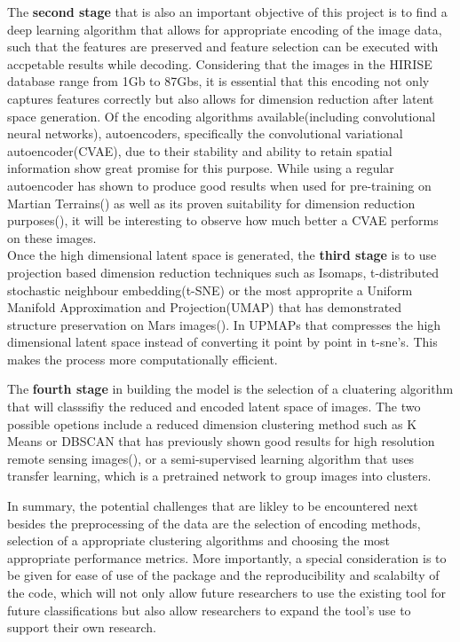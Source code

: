 \documentclass[project-plan]{report-template}
\begin{document}
The \textbf{second stage} that is also an important objective of this project is to find a deep learning algorithm that allows for appropriate encoding of the image data, such that the features are preserved and feature selection can be executed with accpetable results while decoding. Considering that the images in the HIRISE database range from 1Gb to 87Gbs, it is essential that this encoding not only captures features correctly but also allows for dimension reduction after latent space generation. Of the encoding algorithms available(including convolutional neural networks), autoencoders, specifically the convolutional variational autoencoder(CVAE), due to their stability and ability to retain spatial information show great promise for this purpose. While using a regular autoencoder has shown to produce good results when used for pre-training on Martian Terrains(\citeauthor{Rothrock2016SPOCDL}) as well as its proven suitability for dimension reduction purposes(\citeauthor{WANG2016232}), it will be interesting to observe how much better a CVAE performs on these images. \\

Once the high dimensional latent space is generated, the \textbf{third stage} is to use projection based dimension reduction techniques such as Isomaps, t-distributed stochastic neighbour embedding(t-SNE) or the most approprite a Uniform Manifold Approximation and Projection(UMAP) that has demonstrated structure preservation on Mars images(\citeauthor{Allaoui2020ConsiderablyIC}). In UPMAPs that compresses the high dimensional latent space  instead of converting it point by point in t-sne's. This makes the process more computationally efficient.

The \textbf{fourth stage} in building the model is the selection of a cluatering algorithm that will classsifiy the reduced and encoded latent space of images. The two possible opetions include a reduced dimension clustering method such as K Means or DBSCAN that has previously shown good results for high resolution remote sensing images(\citeauthor{ZHANG201675}), or a semi-supervised learning algorithm that uses transfer learning, which is a pretrained network to group images into clusters.

In summary, the potential challenges that are likley to be encountered next besides the preprocessing of the data are the selection of encoding methods, selection of a appropriate clustering algorithms and choosing the most appropriate performance metrics. More importantly, a special consideration is to be given for ease of use of the package and the reproducibility and scalabilty of the code, which will not only allow future researchers to use the existing tool for future classifications but also allow researchers to expand the tool's use to support their own research. 
\end{document}
